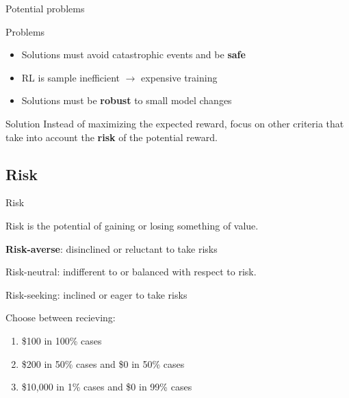 \documentclass{beamer}
\begin{document}
\begin{frame}{Potential problems}

\begin{alertblock}{Problems}
\begin{itemize}
\item Solutions must avoid catastrophic events and be \textbf{safe}
\item RL is sample inefficient $\to$ expensive training
\item Solutions must be \textbf{robust} to small model changes
\end{itemize}
\end{alertblock}

\vspace{1cm}

\begin{exampleblock}{Solution}
Instead of maximizing the expected reward, focus on other criteria that take into account the \textbf{risk} of the potential reward.
\end{exampleblock}

\end{frame}


\subsection{Risk}

\begin{frame}{Risk}
\begin{definition}
Risk is the potential of gaining or losing something of value.

\vspace{3mm}
\textbf{Risk-averse}: disinclined or reluctant to take risks

\vspace{1mm}
Risk-neutral: indifferent to or balanced with respect to risk.

\vspace{1mm}
Risk-seeking: inclined or eager to take risks
\end{definition}



\begin{example}
Choose between recieving:
\begin{enumerate}
\item \$100 in 100\% cases
\item \$200 in 50\% cases and \$0 in 50\% cases
\item \$10,000 in 1\% cases and \$0 in 99\% cases
\end{enumerate}
\end{example}
\end{frame}
\end{document}
